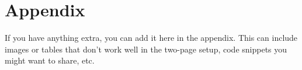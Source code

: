 \documentclass{article}\usepackage[]{graphicx}\usepackage[]{xcolor}
\begin{document}
\newpage
\onecolumn
\section{Appendix}

If you have anything extra, you can add it here in the appendix. This can include images or tables that don't work well in the two-page setup, code snippets you might want to share, etc.
\end{document}

